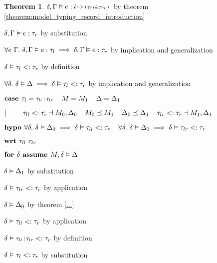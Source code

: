 \documentclass[acmsmall]{acmart}
\theoremstyle{definition}
\newtheorem{theorem}{Theorem}[section]
\begin{document}
\begin{theorem}
          \item \Z\Z\Z\Z $\delta, \Gamma \satisfies e \hastype \J{$l$->($\tau_{rl}$\&$\tau_{rr}$)}$ by theorem \ref{theorem:model_typing_record_introduction} 
          \item \Z\Z\Z\Z $\delta, \Gamma \vDash e : \tau_r$ by substitution 
        \item \Z\Z\Z $\forall e\ \Gamma .\ \delta, \Gamma \vDash e : \tau_l \implies 
          \delta, \Gamma \vDash e : \tau_r
        $ by implication and generalization
        \item \Z\Z\Z $\delta \vDash \tau_l <: \tau_r$
        by definition 
      \item \Z\Z $\forall \delta .\ \delta \vDash \Delta \implies \delta \vDash \tau_l <: \tau_r$ 
      by implication and generalization 


    \item \Z $\B{case } 
      \tau_l = \J{$\tau_{ll}$|$\tau_{lr}$}
      \I
      M = M_1
      \I
      \Delta = \Delta_1
    $
    \item \Z $|\ \ \ \ \ \ \ 
      \tau_{ll} <: \tau_r
      \dashv M_0, \Delta_0
      \hspace{4mm}
      M_0 \preceq M_1
      \hspace{4mm}
      \Delta_0 \preceq \Delta_1
      \hspace{4mm}
      \tau_{lr} <: \tau_r
      \dashv M_1, \Delta_1
    $

    \item \Z $\textbf{hypo } 
      \forall \delta .\ \delta \vDash \Delta_0 \implies \delta \vDash \tau_{ll} <: \tau_r
      \hspace{4mm}
      \forall \delta .\ \delta \vDash \Delta_1 \implies \delta \vDash \tau_{lr} <: \tau_r
    $
    \item \Z $\textbf{wrt } \tau_{ll}\ \tau_{lr}$

      \item \Z\Z $\textbf{for } \delta \textbf{ assume } M, \delta \vDash \Delta$
        \item \Z\Z\Z $\delta \vDash \Delta_1$ by substitution 
        \item \Z\Z\Z $\delta \vDash \tau_{lr} <: \tau_r$ by application 
        \item \Z\Z\Z $\delta \vDash \Delta_0$ by theorem \ref{...}  
        \item \Z\Z\Z $\delta \vDash \tau_{ll} <: \tau_r$ by application 
        \item \Z\Z\Z $\delta \satisfies \J{$\tau_{ll}$|$\tau_{lr}$} \subtypes \tau_r$ 
        by definition
        \item \Z\Z\Z $\delta \vDash \tau_l <: \tau_r$ 
        by substitution 


\end{theorem}
\end{document}
